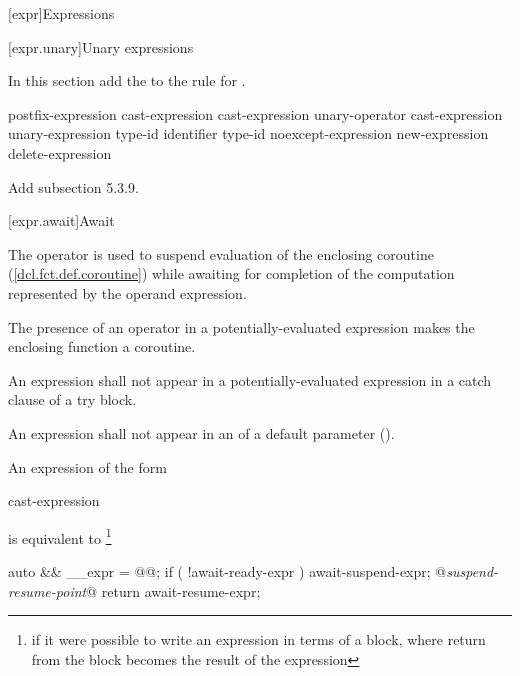 

\setcounter{chapter}{4}
[expr]{Expressions}

\setcounter{section}{2}
[expr.unary]{Unary expressions}

In this section add the   
to the rule for .

\begin{bnf}
	\br
	postfix-expression\br
	\terminal{++} cast-expression\br
	\terminal{-{-}} cast-expression\br
	\br
	unary-operator cast-expression\br
	 unary-expression\br
	 type-id \terminal{)}\br
	 \terminal{(} identifier \terminal{)}\br
	 type-id \terminal{)}\br
	noexcept-expression\br
	new-expression\br
	delete-expression\br
\end{bnf}

Add subsection 5.3.9.

\setcounter{subsection}{8}
[expr.await]{Await}

\pnum
The  operator is used to suspend evaluation of the enclosing coroutine (\ref{dcl.fct.def.coroutine}) while awaiting
for completion of the computation represented by the operand expression.

\pnum
The presence of an  operator in a potentially-evaluated expression makes the enclosing function a coroutine.

\pnum
An  expression shall not appear in a potentially-evaluated expression in a catch clause of a try block.

\pnum
An  expression shall not appear in an  of a default parameter ().


\pnum
An  expression of the form

\begin{ncbnf}
	 cast-expression
\end{ncbnf}

is equivalent to \footnote{if it were possible to write
an expression in terms of a block, where return from the 
block becomes the result of the expression}

\begin{codeblock}
{
  auto && __expr = @@;
  if ( !await-ready-expr ) {
    await-suspend-expr;
    @\textit{suspend-resume-point}@
  }
  return await-resume-expr;
}
\end{codeblock}

